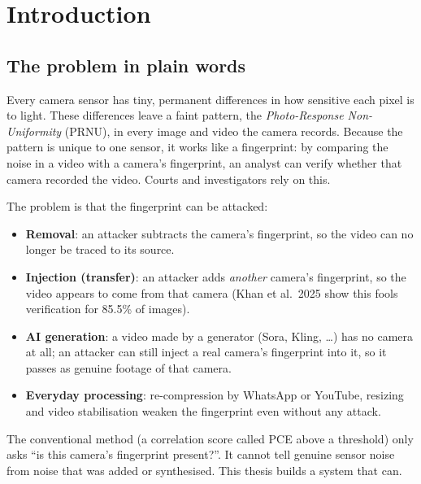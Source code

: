 \documentclass[11pt,a4paper]{article}
\begin{document}
\tableofcontents
\newpage

\section{Introduction}

\subsection{The problem in plain words}
Every camera sensor has tiny, permanent differences in how sensitive each pixel is to light. These differences leave a faint
pattern, the \emph{Photo-Response Non-Uniformity} (PRNU), in every image and video the camera records. Because the pattern
is unique to one sensor, it works like a fingerprint: by comparing the noise in a video with a camera's fingerprint, an
analyst can verify whether that camera recorded the video. Courts and investigators rely on this.

The problem is that the fingerprint can be attacked:
\begin{itemize}
\item \textbf{Removal}: an attacker subtracts the camera's fingerprint, so the video can no longer be traced to its source.
\item \textbf{Injection (transfer)}: an attacker adds \emph{another} camera's fingerprint, so the video appears to come from
      that camera (Khan et al.\ 2025 show this fools verification for 85.5\% of images).
\item \textbf{AI generation}: a video made by a generator (Sora, Kling, \dots) has no camera at all; an attacker can still
      inject a real camera's fingerprint into it, so it passes as genuine footage of that camera.
\item \textbf{Everyday processing}: re-compression by WhatsApp or YouTube, resizing and video stabilisation weaken the
      fingerprint even without any attack.
\end{itemize}
The conventional method (a correlation score called PCE above a threshold) only asks ``is this camera's fingerprint present?''.
It cannot tell genuine sensor noise from noise that was added or synthesised. This thesis builds a system that can.
\end{document}
